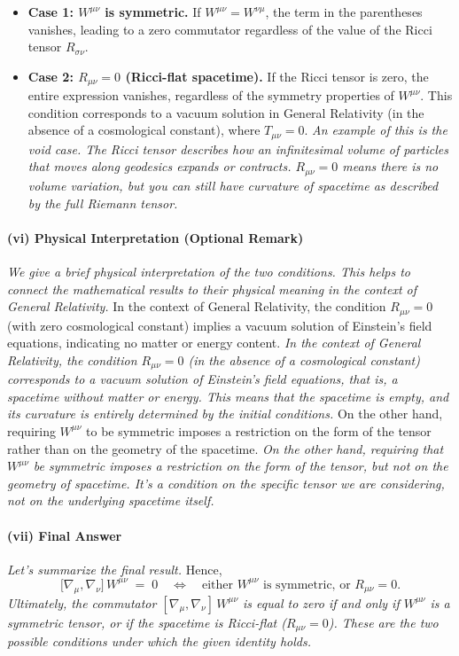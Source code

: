 \begin{itemize}
    \item \textbf{Case 1: $W^{\mu\nu}$ is symmetric.} If $W^{\mu\nu} = W^{\nu\mu}$, the term in the parentheses vanishes, leading to a zero commutator regardless of the value of the Ricci tensor \(R_{\sigma\nu}\).

    \item \textbf{Case 2: $R_{\mu\nu} = 0$ (Ricci-flat spacetime).} If the Ricci tensor is zero, the entire expression vanishes, regardless of the symmetry properties of \(W^{\mu\nu}\). This condition corresponds to a vacuum solution in General Relativity (in the absence of a cosmological constant), where \(T_{\mu\nu} = 0\).  \textit{An example of this is the void case. The Ricci tensor describes how an infinitesimal volume of particles that moves along geodesics expands or contracts. \(R_{\mu\nu} = 0\) means there is no volume variation, but you can still have curvature of spacetime as described by the full Riemann tensor.}
\end{itemize}


\paragraph{(vi) Physical Interpretation (Optional Remark)}
\textit{We give a brief physical interpretation of the two conditions. This helps to connect the mathematical results to their physical meaning in the context of General Relativity.}
In the context of General Relativity, the condition $R_{\mu\nu}=0$ (with zero cosmological constant) implies a vacuum solution of Einstein's field equations, indicating no matter or energy content.
\textit{In the context of General Relativity, the condition \(R_{\mu\nu}=0\) (in the absence of a cosmological constant) corresponds to a vacuum solution of Einstein's field equations, that is, a spacetime without matter or energy. This means that the spacetime is empty, and its curvature is entirely determined by the initial conditions.}
On the other hand, requiring $W^{\mu\nu}$ to be symmetric imposes a restriction on the form of the tensor rather than on the geometry of the spacetime.
\textit{On the other hand, requiring that \(W^{\mu\nu}\) be symmetric imposes a restriction on the form of the tensor, but not on the geometry of spacetime. It's a condition on the specific tensor we are considering, not on the underlying spacetime itself.}

\paragraph{(vii) Final Answer}
\textit{Let's summarize the final result.}
Hence,
\[
\bigl[\nabla_{\mu}, \nabla_{\nu}\bigr]\,W^{\mu\nu}
\;=\;0
\quad
\Longleftrightarrow
\quad
\text{either }W^{\mu\nu}\text{ is symmetric, or }R_{\mu\nu}=0.
\]
\textit{Ultimately, the commutator \([\nabla_{\mu}, \nabla_{\nu}]\,W^{\mu\nu}\) is equal to zero if and only if \(W^{\mu\nu}\) is a symmetric tensor, or if the spacetime is Ricci-flat (\(R_{\mu\nu}=0\)). These are the two possible conditions under which the given identity holds.}


